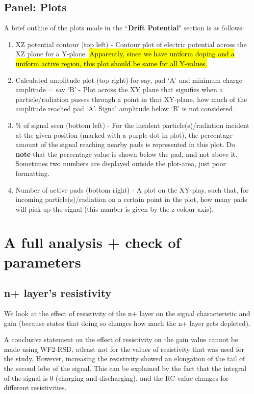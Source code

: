 \documentclass[11pt]{article}
\newcommand{\hlyellow}[1]{{\sethlcolor{yellow}\hl{#1}}}
\begin{document}
\subsection{Panel: Plots}
A brief outline of the plots made in the ``\textbf{Drift Potential}" section is as follows:
\begin{enumerate}
    \item XZ potential contour (top left) - Contour plot of electric potential across the XZ plane for a Y-plane. \hlyellow{Apparently, since we have uniform doping and a uniform active region, this plot should be same for all Y-values.}
    \item Calculated amplitude plot (top right) for say, pad `A' and minimum charge amplitude = say `B' - Plot across the XY plane that signifies when a particle/radiation passes through a point in that XY-plane, how much of the amplitude reached pad `A'. Signal amplitude below `B' is not considered.
    \item \% of signal seen (bottom left) - For the incident particle(s)/radiation incident at the given position (marked with a purple dot in plot), the percentage amount of the signal reaching nearby pads is represented in this plot. Do \textbf{note} that the percentage value is shown below the pad, and not above it. Sometimes two numbers are displayed outside the plot-area, just poor formatting.
    \item Number of active pads (bottom right) - A plot on the XY-play, such that, for incoming particle(s)/radiation on a certain point in the plot, how many pads will pick up the signal (this number is given by the z-colour-axis).
\end{enumerate}

\section{A full analysis + check of parameters}\label{sec:full-analysis}
\subsection{n+ layer's resistivity}
We look at the effect of resistivity of the n+ layer on the signal characteristic and gain (because \cite{giacomini-lgad} states that doing so changes how much the n+ layer gets depleted).

A conclusive statement on the effect of resistivity on the gain value cannot be made using WF2-RSD, atleast not for the values of resistivity that was used for the study. However, increasing the resistivity showed an elongation of the tail of the second lobe of the signal. This can be explained by the fact that the integral of the signal is 0 (charging and discharging), and the RC value changes for different resistivities.
\end{document}

